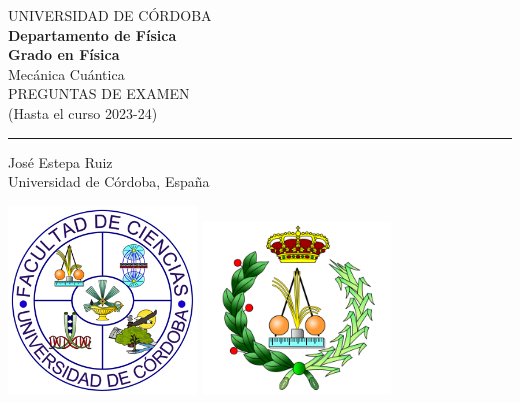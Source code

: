 \AddToShipoutPicture*{\BackgroundPic}
\begin{titlepage}
\begin{center}
\Large UNIVERSIDAD DE CÓRDOBA\\[0.5 cm]
\large  \textbf{Departamento de Física}\\[1.25 cm]
\large \textbf{Grado en Física}\\[1.25 cm]
\Large  Mecánica Cuántica \\[2.25 cm]
\Huge   PREGUNTAS DE EXAMEN \\
\Large  (Hasta el curso 2023-24)
\end{center}
\vspace{1.25cm}
{\color{blue}\hrule}
\vspace{0.5cm}
\begin{center}
\noindent \Large{José Estepa Ruiz \\ Universidad de Córdoba, España}
\end{center}
\vfill

\begin{center}
\begin{multicols}{2}
    \includegraphics[width=5cm]{img/logo_ciencias.png}
    \columnbreak
    \includegraphics[width=5cm]{img/Fisica_XL_transparente.png}
\end{multicols}
\end{center}

\vfill
\large \rightline{\today}
\end{titlepage}
\renewcommand{\baselinestretch}{0.9}
\ClearShipoutPicture
\restoregeometry